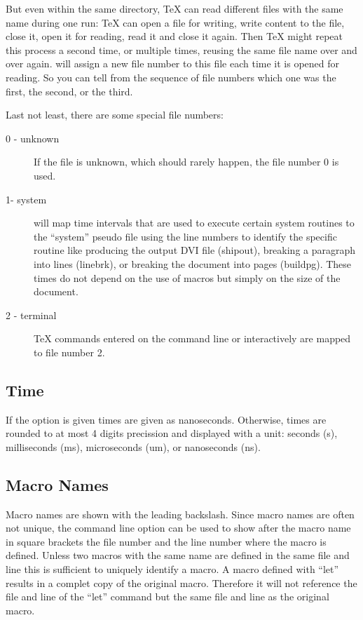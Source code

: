 \documentclass[a4paper,english]{article}
\begin{document}
But even within the same
directory, TeX can read different files with the same name during one
run: TeX can open a file for writing, write content to the file, close
it, open it for reading, read it and close it again. Then TeX might
repeat this process a second time, or multiple times, reusing the same
file name over and over again.   will assign a new file
number to this file each time it is opened for reading. So you can
tell from the sequence of file numbers which one was the first, the
second, or the third.

Last not least, there are some special file
numbers:
\begin{description}
\item[0 - unknown]
  If the file is unknown, which should rarely happen,
  the file number 0 is used.
\item[1- system]
   will map
  time intervals that are used to execute certain system routines
  to the ``system'' pseudo file 
using the line numbers to identify the specific routine
like producing the output DVI file (shipout), breaking
a paragraph into lines (linebrk), or breaking the
document into pages (buildpg). These times do not depend on the
use of macros but simply on the size of the document.
\item[2 - terminal]
  TeX commands entered on the command line or interactively are mapped
  to file number 2.
\end{description}

\subsection{Time}
If the option  is given times are given as nanoseconds.
Otherwise, times are rounded to at most 4 digits precission and
displayed with a unit: seconds (s), milliseconds (ms), microseconds
(um), or nanoseconds (ns).

\subsection{Macro Names}
Macro names are shown with the leading backslash.  Since macro names
are often not unique, the command line option  can be used to
show after the macro name in square brackets the file number and the
line number where the macro is defined.  Unless two macros with the
same name are defined in the same file and line this is sufficient to
uniquely identify a macro. A macro defined with ``let'' results in a
complet copy of the original macro. Therefore it will not reference
the file and line of the ``let'' command but the same file and line as
the original macro.
\end{document}
